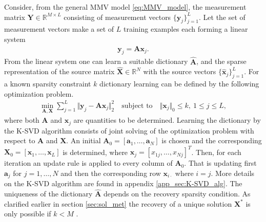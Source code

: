 Consider, from the general MMV model \eqref{eq:MMV_model}, the measurement matrix $\mathbf{Y} \in \mathbb{R}^{M \times L}$ consisting of measurement vectors $\lbrace \mathbf{y}_j \rbrace_{j=1}^L$. Let the set of measurement vectors make a set of $L$ training examples each forming a linear system
\begin{align*}
\mathbf{y}_j = \mathbf{A} \mathbf{x}_j.
\end{align*}
From the linear system one can learn a suitable dictionary $\hat{\mathbf{A}}$, and the sparse representation of the source matrix $\hat{\mathbf{X}} \in \mathbb{R}^N$ with the source vectors $\lbrace \hat{\mathbf{x}}_j \rbrace_{j=1}^L$.
For a known sparsity constraint $k$ dictionary learning can be defined by the following optimization problem. 
\begin{align}\label{eq:SVD1}
\min_{\mathbf{A}, \mathbf{X}} \sum_{j=1}^{L} \Vert \mathbf{y}_j - \mathbf{A} \mathbf{x}_j \Vert_2^2 \quad \text{subject to} \quad \Vert \mathbf{x}_j \Vert_0 \leq k, \ 1 \leq j \leq L,
\end{align}
where both $\mathbf{A}$ and $\mathbf{x}_j$ are quantities to be determined.
Learning the dictionary by the K-SVD algorithm consists of joint solving of the optimization problem with respect to $\mathbf{A}$ and $\mathbf{X}$. 
An initial $\mathbf{A}_0 = [\mathbf{a}_1, \dots, \mathbf{a}_N]$ is chosen and the corresponding $\mathbf{X}_0 = [\mathbf{x}_1, \dots, \mathbf{x}_L]$ is determined, where $\mathbf{x}_j = [x_{1j}, \dots, x_{Nj}]^T$. Then, for each iteration an update rule is applied to every column of $\mathbf{A}_0$. That is updating first $\mathbf{a}_j$ for $j = 1, \dots, N$ and then the corresponding row $\mathbf{x}_{i\cdot}$ where $i = j$. 
More details on the K-SVD algorithm are found in appendix \ref{app_sec:K-SVD_alg}. 
The uniqueness of the dictionary $\hat{\mathbf{A}}$ depends on the recovery sparsity condition. As clarified earlier in section \ref{sec:sol_met} the recovery of a unique solution $\mathbf{X}^\ast$ is only possible if $k < M$ \cite{phd2015}.


